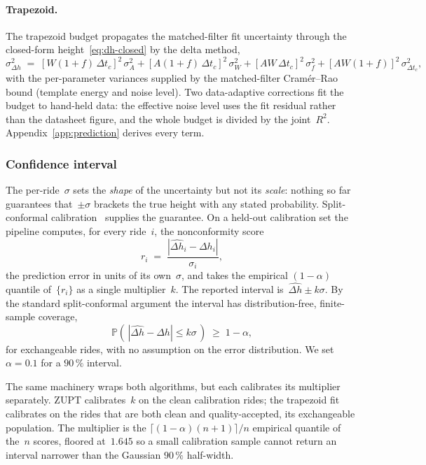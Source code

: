 \documentclass[manuscript,review,screen]{acmart}
\begin{document}
\paragraph{Trapezoid.}
The trapezoid budget propagates the matched-filter fit uncertainty
through the closed-form height~\eqref{eq:dh-closed} by the delta
method,
\begin{equation}
  \sigma_{\Delta h}^{2}
  \;=\;[W(1{+}f)\,\Delta t_c]^{2}\,\sigma_A^{2}
       +[A(1{+}f)\,\Delta t_c]^{2}\,\sigma_W^{2}
       +[AW\,\Delta t_c]^{2}\,\sigma_f^{2}
       +[AW(1{+}f)]^{2}\,\sigma_{\Delta t_c}^{2},
  \label{eq:sigma-dh}
\end{equation}
with the per-parameter variances supplied by the matched-filter
Cram\'er--Rao bound (template energy and noise level).  Two
data-adaptive corrections fit the budget to hand-held data: the
effective noise level uses the fit residual rather than the datasheet
figure, and the whole budget is divided by the joint~$R^{2}$.
Appendix~\ref{app:prediction} derives every term.

\subsubsection{Confidence interval}
\label{sec:algo-ci}

The per-ride~$\sigma$ sets the \emph{shape} of the uncertainty but
not its \emph{scale}: nothing so far guarantees that~$\pm\sigma$
brackets the true height with any stated probability.  Split-conformal
calibration~\cite{lei2014split} supplies the guarantee.  On a held-out
calibration set the pipeline computes, for every ride~$i$, the
nonconformity score
\begin{equation}
  r_i \;=\; \frac{|\widehat{\Delta h}_i - \Delta h_i|}{\sigma_i},
  \label{eq:nonconformity}
\end{equation}
the prediction error in units of its own~$\sigma$, and takes the
empirical $(1-\alpha)$ quantile of~$\{r_i\}$ as a single
multiplier~$k$.  The reported interval is~$\widehat{\Delta h}\pm
k\sigma$.  By the standard split-conformal argument the interval has
distribution-free, finite-sample coverage,
\begin{equation}
  \mathbb{P}\!\left(\,|\widehat{\Delta h}-\Delta h|\le k\sigma\,\right)
  \;\ge\; 1-\alpha,
  \label{eq:conformal-coverage}
\end{equation}
for exchangeable rides, with no assumption on the error
distribution.  We set $\alpha=0.1$ for a $90\,\%$ interval.

The same machinery wraps both algorithms, but each calibrates its
multiplier separately.  ZUPT calibrates~$k$ on the clean
calibration rides; the trapezoid fit calibrates on the rides that are
both clean and quality-accepted, its exchangeable population.  The
multiplier is the $\lceil(1-\alpha)(n+1)\rceil/n$ empirical quantile
of the~$n$ scores, floored at~$1.645$ so a small calibration sample
cannot return an interval narrower than the Gaussian $90\,\%$
half-width.
\end{document}
